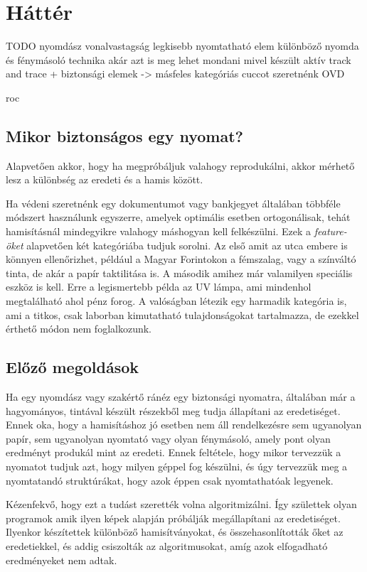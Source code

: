 \newpage
\section{Háttér}



TODO
nyomdász
vonalvastagság
legkisebb nyomtatható elem
különböző nyomda és fénymásoló technika
akár azt is meg lehet mondani mivel készült
aktív track and trace + biztonsági elemek
-> másfeles kategóriás cuccot szeretnénk
OVD


roc


\subsection{Mikor biztonságos egy nyomat?}

Alapvetően akkor, hogy ha megpróbáljuk valahogy reprodukálni, akkor
mérhető lesz a különbség az eredeti és a hamis között.

Ha védeni szeretnénk egy dokumentumot vagy bankjegyet általában 
többféle módszert használunk egyszerre, amelyek optimális esetben 
ortogonálisak, tehát hamisításnál mindegyikre valahogy máshogyan kell 
felkészülni. Ezek a \textit{feature-öket} alapvetően két kategóriába tudjuk sorolni. 
Az első amit az utca embere is könnyen ellenőrizhet, például a Magyar Forintokon 
a fémszalag, vagy a színváltó tinta, de akár a papír taktilitása is.
A második amihez már valamilyen speciális eszköz is kell. Erre a legismertebb 
példa az UV lámpa, ami mindenhol megtalálható ahol pénz forog.
A valóságban létezik egy harmadik kategória is, ami a titkos, csak 
laborban kimutatható tulajdonságokat tartalmazza, de ezekkel érthető
módon nem foglalkozunk.


\subsection{Előző megoldások}

Ha egy nyomdász vagy szakértő ránéz egy biztonsági nyomatra, 
általában már a hagyományos, tintával készült részekből meg tudja
állapítani az eredetiséget. Ennek oka, hogy a hamisításhoz jó esetben nem áll 
rendelkezésre sem ugyanolyan papír, sem ugyanolyan nyomtató vagy olyan fénymásoló,
amely pont olyan eredményt produkál mint az eredeti.
Ennek feltétele, hogy mikor tervezzük a nyomatot tudjuk azt, hogy
milyen géppel fog készülni, és úgy tervezzük meg a nyomtatandó struktúrákat,
hogy azok éppen csak nyomtathatóak legyenek.


Kézenfekvő, hogy ezt a tudást szerették volna algoritmizálni. Így születtek olyan
programok amik ilyen képek alapján próbálják megállapítani az eredetiséget. 
Ilyenkor készítettek különböző hamisítványokat, és összehasonlították őket az eredetiekkel,
és addig csiszolták az algoritmusokat, amíg azok elfogadható eredményeket nem adtak.


